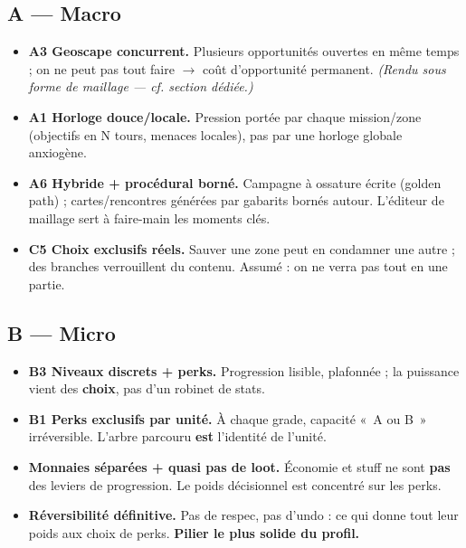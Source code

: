 \documentclass[11pt,a4paper]{article}
\begin{document}
\subsection{A --- Macro}
\begin{itemize}
\item \textbf{A3 Geoscape concurrent.} Plusieurs opportunités ouvertes en même temps ; on ne peut pas tout faire $\rightarrow$ coût d'opportunité permanent. \emph{(Rendu sous forme de maillage --- cf. section dédiée.)}
\item \textbf{A1 Horloge douce/locale.} Pression portée par chaque mission/zone (objectifs en N tours, menaces locales), pas par une horloge globale anxiogène.
\item \textbf{A6 Hybride + procédural borné.} Campagne à ossature écrite (golden path) ; cartes/rencontres générées par gabarits bornés autour. L'éditeur de maillage sert à faire-main les moments clés.
\item \textbf{C5 Choix exclusifs réels.} Sauver une zone peut en condamner une autre ; des branches verrouillent du contenu. Assumé : on ne verra pas tout en une partie.
\end{itemize}

\subsection{B --- Micro}
\begin{itemize}
\item \textbf{B3 Niveaux discrets + perks.} Progression lisible, plafonnée ; la puissance vient des \textbf{choix}, pas d'un robinet de stats.
\item \textbf{B1 Perks exclusifs par unité.} À chaque grade, capacité «~A ou B~» irréversible. L'arbre parcouru \textbf{est} l'identité de l'unité.
\item \textbf{Monnaies séparées + quasi pas de loot.} Économie et stuff ne sont \textbf{pas} des leviers de progression. Le poids décisionnel est concentré sur les perks.
\item \textbf{Réversibilité définitive.} Pas de respec, pas d'undo : ce qui donne tout leur poids aux choix de perks. \textbf{Pilier le plus solide du profil.}
\end{itemize}
\end{document}

